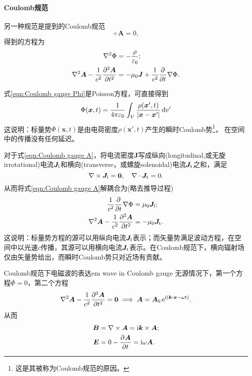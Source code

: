 \paragraph{Coulomb规范}
另一种规范是提到的Coulomb规范
\[
    \div\bm A=0,
\]
得到的方程为
\begin{subequations}
    \begin{align}
        \label{eqn:Coulomb gauge Phi}
        \lapla\Phi&=-\frac\rho{\varepsilon_0};\\
        \label{eqn:Coulomb gauge A}
        \lapla\bm A-\frac1{c^2}\pv[2]{\bm A}t&=-\mu_0\bm J+\frac1{c^2}\pp t\nabla\Phi.
    \end{align}
\end{subequations}

式\eqref{eqn:Coulomb gauge Phi}是Poisson方程，可直接得到
\[
    \Phi(\bm x,t)=\frac1{4\pi\varepsilon_0}\int_V\frac{\rho(\bm x',t)}{|\bm x-\bm x'|}\d v'
\]
这说明：标量势$\Phi(\bm x,t)$是由电荷密度$\rho(\bm x',t)$产生的瞬时Coulomb势\footnote{这是其被称为Coulomb规范的原因。}，%
在空间中的传播没有任何延迟。

对于式\eqref{eqn:Coulomb gauge A}，将电流密度$\bm J$写成纵向(longitudinal,或无旋irrotational)电流$\bm J_\text l$和横向(transverse，或螺旋solenoidal)电流$\bm J_\text t$之和，满足
\[
    \curl\bm J_\text l=\bm 0,\quad\div\bm J_\text t=0.
\]
从而将式\eqref{eqn:Coulomb gauge A}解耦合为(略去推导过程)
\begin{align*}
    \frac1{c^2}\pp t\nabla\Phi&=\mu_0\bm J_\text l;\\
    \lapla\bm A-\frac1{c^2}\pv[2]{\bm A}t&=-\mu_0\bm J_\text t.
\end{align*}
这说明：标量势方程的源可以用纵向电流$\bm J_\text l$表示；而矢量势满足波动方程，在空间中以光速$c$传播，其源可以用横向电流$\bm J_\text t$表示。在Coulomb规范下，横向辐射场仅由矢量势给出，而瞬时Coulomb势只对近场有贡献。

\begin{example}{Coulomb规范下电磁波的表达}{em wave in Coulomb gauge}
    无源情况下，第一个方程$\Phi=0$，第二个方程
    \[
        \lapla\bm A-\frac1{c^2}\pv[2]{\bm A}t=\bm 0\implies\bm A=\bm A_0\e{\i(\bm k\cdot\bm x-\omega t)}.
    \]
    从而
    \begin{align*}
        \bm B&=\curl\bm A=\i\bm k\times\bm A;\\
        \bm E&=0-\pv{\bm A}t=\i\omega\bm A.
    \end{align*}
\end{example}
